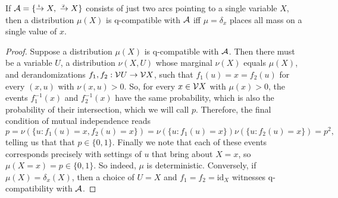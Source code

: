 \documentclass{article}
\begin{document}
\begin{prop} %
    If $\Ar = \{ \ed1{}X, ~ \ed2{}X \}$ consists of just two arcs pointing to a single variable $X$, 
    then a distribution $\mu(X)$ is q-compatible with $\mathcal A$ iff $\mu = \delta_x$ places all mass on a single value of $x$. 
\end{prop}
\begin{proof}
    Suppose a distribution $\mu(X)$ is q-compatible with $\mathcal A$. Then there must be a variable $U$, a distribution $\nu(X,U)$ whose marginal $\nu(X)$ equals $\mu(X)$, and derandomizations $f_1, f_2 : \mathcal V U \to \mathcal V X$, such that $f_1(u) = x = f_2(u)$ for every $(x,u)$ with $\nu(x,u) > 0$.
    So, for every $x \in \mathcal V X$ with $\mu(x) > 0$, the events $f^{-1}_1(x)$ and $f_2^{-1}(x)$ have the same probability, which is also the probability of their intersection, which we will call $p$.
    Therefore, the final condition of mutual independence reads
    \[
        p = \nu(\{ u : f_1(u) {=} x, f_2(u) {=} x\}) = \nu(\{u : f_1(u) {=} x\})\nu(\{u : f_2(u) {=} x\}) = p^2,
    \]
    telling us that that $p \in \{0,1\}$. Finally we note that each of these events corresponds precisely with settings of $u$ that bring about $X=x$, so $\mu(X{=}x) = p \in \{0,1\}$. So indeed, $\mu$ is deterministic. 
    Conversely, if $\mu(X) = \delta_x(X)$, then a choice of $U = X$ and $f_1 = f_2 = \mathrm{id}_X$ witnesses q-compatibility with $\mathcal A$. 
\end{proof}
\end{document}
